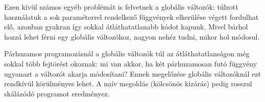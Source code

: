\documentclass[a4paper,11.5pt,table]{article}
\begin{document}
	Ezen kívül számos egyéb problémát is felvetnek a globális változók: túlzott használatuk a sok paraméterrel rendelkező függvények elkerülése végett fordulhat elő, azonban gyakran így sokkal átláthatatlanabb kódot kapunk. Mivel bárhol hozzá lehet férni egy globális változóhoz, nagyon nehéz tudni, mikor hol módosul.
	\begin{note}
    Párhuzamos programozásnál a globális változók túl az átláthatatlanságon még sokkal több fejtörést okoznak: mi van akkor, ha két párhuzamosan futó függvény ugyanazt a változót akarja módosítani? Ennek megelőzése globális változóknál ezt rendkívül körülményes lehet. A naív megoldás (kölcsönös kizárás) pedig rosszul skálázódó programot eredményez.
	\end{note}
\end{document}

